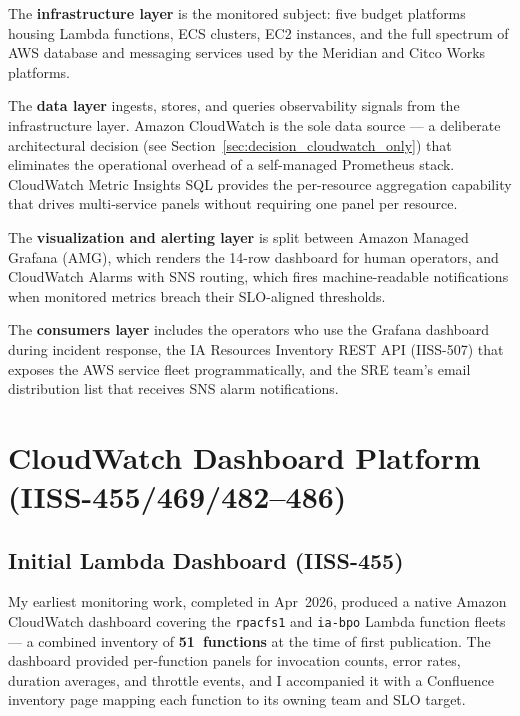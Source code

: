The \textbf{infrastructure layer} is the monitored subject: five budget
platforms housing Lambda functions, ECS clusters, EC2
instances, and the full spectrum of AWS database and messaging services
used by the Meridian and Citco Works platforms.

The \textbf{data layer} ingests, stores, and queries observability signals
from the infrastructure layer. Amazon CloudWatch is the sole data source ---
a deliberate architectural decision (see Section~\ref{sec:decision_cloudwatch_only})
that eliminates the operational overhead of a self-managed Prometheus stack.
CloudWatch Metric Insights SQL provides the per-resource aggregation capability
that drives multi-service panels without requiring one panel per resource.

The \textbf{visualization and alerting layer} is split between Amazon Managed
Grafana (AMG), which renders the 14-row dashboard for human operators, and
CloudWatch Alarms with SNS routing, which fires machine-readable notifications
when monitored metrics breach their SLO-aligned thresholds.

The \textbf{consumers layer} includes the operators who use the Grafana
dashboard during incident response, the IA Resources Inventory REST API
(IISS-507) that exposes the AWS service fleet programmatically, and the SRE
team's email distribution list that receives SNS alarm notifications.

\section{CloudWatch Dashboard Platform (IISS-455/469/482--486)}
\label{sec:cw_dashboard_platform}

\subsection{Initial Lambda Dashboard (IISS-455)}

My earliest monitoring work, completed in Apr~2026, produced a native
Amazon CloudWatch dashboard covering the \texttt{rpacfs1} and
\texttt{ia-bpo} Lambda function fleets --- a combined inventory of
\textbf{51~functions} at the time of first publication. The dashboard
provided per-function panels for invocation counts, error rates, duration
averages, and throttle events, and I accompanied it with a Confluence
inventory page mapping each function to its owning team and SLO target.

